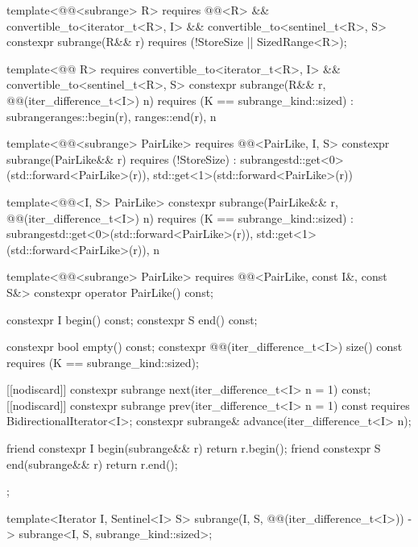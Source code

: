 \begin{codeblock}
{{    template<@@<subrange> R>
      requires @@<R> &&
        convertible_to<iterator_t<R>, I> && convertible_to<sentinel_t<R>, S>
    constexpr subrange(R&& r) requires (!StoreSize || SizedRange<R>);

    template<@@ R>
      requires convertible_to<iterator_t<R>, I> && convertible_to<sentinel_t<R>, S>
    constexpr subrange(R&& r, @@(iter_difference_t<I>) n)
      requires (K == subrange_kind::sized)
        : subrange{ranges::begin(r), ranges::end(r), n}
    {}

    template<@@<subrange> PairLike>
      requires @@<PairLike, I, S>
    constexpr subrange(PairLike&& r) requires (!StoreSize)
      : subrange{std::get<0>(std::forward<PairLike>(r)),
                 std::get<1>(std::forward<PairLike>(r))}
    {}

    template<@@<I, S> PairLike>
    constexpr subrange(PairLike&& r, @@(iter_difference_t<I>) n)
      requires (K == subrange_kind::sized)
      : subrange{std::get<0>(std::forward<PairLike>(r)),
                 std::get<1>(std::forward<PairLike>(r)), n}
    {}

    template<@@<subrange> PairLike>
      requires @@<PairLike, const I&, const S&>
    constexpr operator PairLike() const;

    constexpr I begin() const;
    constexpr S end() const;

    constexpr bool empty() const;
    constexpr @@(iter_difference_t<I>) size() const
      requires (K == subrange_kind::sized);

    [[nodiscard]] constexpr subrange next(iter_difference_t<I> n = 1) const;
    [[nodiscard]] constexpr subrange prev(iter_difference_t<I> n = 1) const
      requires BidirectionalIterator<I>;
    constexpr subrange& advance(iter_difference_t<I> n);

    friend constexpr I begin(subrange&& r) { return r.begin(); }
    friend constexpr S end(subrange&& r) { return r.end(); }
  };

  template<Iterator I, Sentinel<I> S>
    subrange(I, S, @@(iter_difference_t<I>)) ->
      subrange<I, S, subrange_kind::sized>;

}
\end{codeblock}
